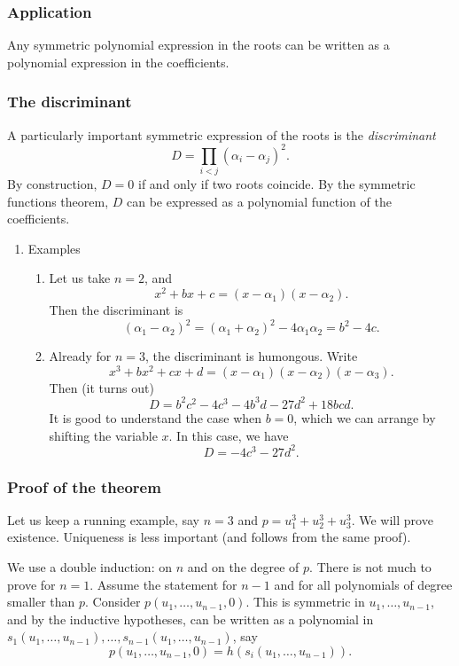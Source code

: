 \documentclass[11pt]{article}
\begin{document}
\subsubsection{Application}
\label{sec:org7109655}
Any symmetric polynomial expression in the roots can be written as a polynomial expression in the coefficients.
\subsubsection{The discriminant}
\label{sec:orge84c223}
A particularly important symmetric expression of the roots is the \emph{discriminant}
\[ D = \prod_{i<j} (\alpha_{i} - \alpha_{j})^{2}.\]
By construction, \(D = 0\) if and only if two roots coincide.
By the symmetric functions theorem, \(D\) can be expressed as a polynomial function of the coefficients.
\begin{enumerate}
\item Examples
\label{sec:org5945323}
\begin{enumerate}
\item Let us take \(n = 2\), and
\[ x^2 +bx + c = (x-\alpha_{1})(x-\alpha_{2}).\]
Then the discriminant is
\[ (\alpha_{1}-\alpha_{2})^2 = (\alpha_{1}+\alpha_{2})^2 - 4\alpha_{1}\alpha_{2} = b^{2}-4c.\]
\item Already for \(n = 3\), the discriminant is humongous.
Write
\[ x^{3} + bx^{2} + cx + d = (x-\alpha_{1})(x-\alpha_{2})(x-\alpha_{3}).\]
Then (it turns out)
\[ D = b^2c^2-4c^3-4b^3d-27d^2+18bcd.\]
It is good to understand the case when \(b = 0\), which we can arrange by shifting the variable \(x\).
In this case, we have
\[ D = -4c^3-27d^2.\]
\end{enumerate}
\end{enumerate}
\subsubsection{Proof of the theorem}
\label{sec:orgee5e55e}

Let us keep a running example, say \(n = 3\) and \(p = u_{1}^3+u_{2}^3+u_{3}^{3}\).
We will prove existence.  Uniqueness is less important (and follows from the same proof).

We use a double induction: on \(n\) and on the degree of \(p\).
There is not much to prove for \(n = 1\).
Assume the statement for \(n-1\) and for all polynomials of degree smaller than \(p\).
Consider \(p(u_{1}, \dots, u_{n-1},0)\).
This is symmetric in \(u_{1}, \dots, u_{n-1}\), and by the inductive hypotheses, can be written as a polynomial in \(s_{1}(u_{1}, \dots, u_{n-1}), \dots, s_{n-1}(u_{1}, \dots, u_{n-1})\), say
\[ p(u_{1}, \dots, u_{n-1}, 0) = h(s_{i}(u_{1}, \dots, u_{n-1})).\]
\end{document}
